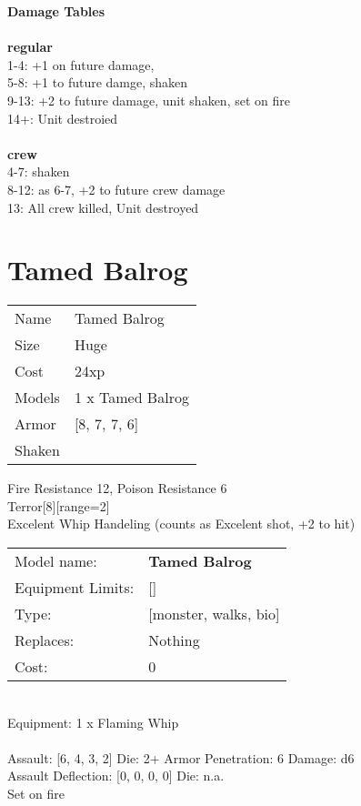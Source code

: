 {\bf Damage Tables} \\
\ \\ {\bf regular } \\
1-4: +1 on future damage, \\
5-8: +1 to future damge, shaken \\
9-13: +2 to future damage, unit shaken, set on fire \\
14+: Unit destroied \\
\ \\ {\bf crew } \\
4-7: shaken \\
8-12: as 6-7, +2 to future crew damage \\
13: All crew killed, Unit destroyed \\










\pagebreak\pagebreak

\section{ Tamed Balrog }

\begin{tabular}{ll}
  Name & Tamed Balrog \\
  Size & Huge\\
  Cost & 24xp\\
  Models & 1 x Tamed Balrog\\
  Armor & [8, 7, 7, 6]\\
  Shaken & \\
\end{tabular}

\noindent Fire Resistance 12, Poison Resistance 6\\ 
Terror[8][range=2]\\ 
Excelent Whip Handeling (counts as Excelent shot, +2 to hit)\\ 


\noindent
\begin{tabular}{ll}
Model name: &{\bf Tamed Balrog } \\
Equipment Limits: &[] \\
Type: &[monster, walks, bio] \\
Replaces: &Nothing \\
Cost: & 0\\
\end{tabular}
\ \\
Equipment: 1 x Flaming Whip \\
\ \\
Assault: [6, 4, 3, 2] Die: 2+ Armor Penetration: 6 Damage: d6 \\
Assault Deflection: [0, 0, 0, 0] Die: n.a.\\
\indent Set on fire\\ 
 
